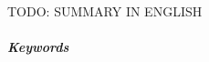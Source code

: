 \chapter*{\summary}

\selectforeignlanguage %

\begin{center}
	\Huge
	TODO: SUMMARY IN ENGLISH
\end{center}

\vspace{0.5cm}
\paragraph{Keywords} \emph{\keywords}

\selectthesislanguage
